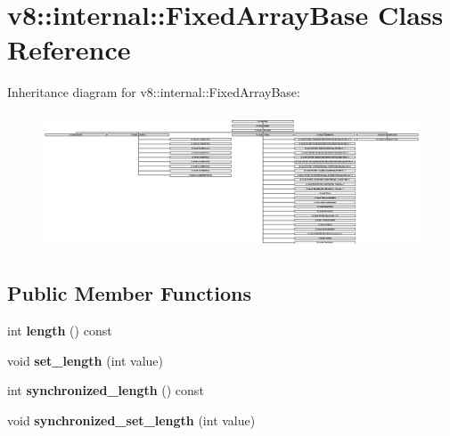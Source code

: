 \hypertarget{classv8_1_1internal_1_1_fixed_array_base}{}\section{v8\+:\+:internal\+:\+:Fixed\+Array\+Base Class Reference}
\label{classv8_1_1internal_1_1_fixed_array_base}
Inheritance diagram for v8\+:\+:internal\+:\+:Fixed\+Array\+Base\+:\begin{figure}[H]
\begin{center}
\leavevmode
\includegraphics[height=4.057971cm]{classv8_1_1internal_1_1_fixed_array_base}
\end{center}
\end{figure}
\subsection*{Public Member Functions}
\begin{DoxyCompactItemize}
\item 
\hypertarget{classv8_1_1internal_1_1_fixed_array_base_a2c3e68e799dd129e03ad376e4129ba6b}{}int {\bfseries length} () const \label{classv8_1_1internal_1_1_fixed_array_base_a2c3e68e799dd129e03ad376e4129ba6b}

\item 
\hypertarget{classv8_1_1internal_1_1_fixed_array_base_a67b8eea4413f1651bfe1a8b4c74f53d1}{}void {\bfseries set\+\_\+length} (int value)\label{classv8_1_1internal_1_1_fixed_array_base_a67b8eea4413f1651bfe1a8b4c74f53d1}

\item 
\hypertarget{classv8_1_1internal_1_1_fixed_array_base_af299c5ebae56695bf60c5cb56e16fa83}{}int {\bfseries synchronized\+\_\+length} () const \label{classv8_1_1internal_1_1_fixed_array_base_af299c5ebae56695bf60c5cb56e16fa83}

\item 
\hypertarget{classv8_1_1internal_1_1_fixed_array_base_ac4a59d797d382670634fa9b046eba1cc}{}void {\bfseries synchronized\+\_\+set\+\_\+length} (int value)\label{classv8_1_1internal_1_1_fixed_array_base_ac4a59d797d382670634fa9b046eba1cc}

\end{DoxyCompactItemize}
